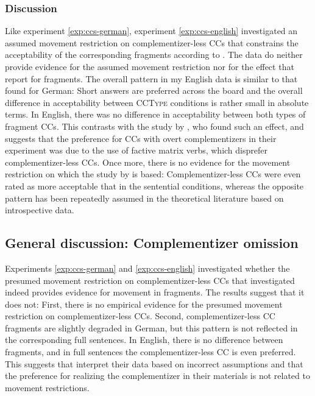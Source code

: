 \newpage
\subsubsection{Discussion}
Like experiment \ref{exp:ccs-german}, experiment \ref{exp:ccs-english} investigated an assumed movement restriction on complementizer-less CCs that constrains the acceptability of the corresponding fragments according to \citet{merchant.etal2013}. The data do neither provide evidence for the assumed movement restriction nor for the effect that \citet{merchant.etal2013} report for fragments. The overall pattern in my English data is similar to that found for German: Short answers are preferred across the board and the overall difference in acceptability between \textsc{CCType} conditions is rather small in absolute terms. In English, there was no difference in acceptability between both types of fragment CCs. This contrasts with the study by \citet{merchant.etal2013}, who found such an effect, and suggests that the preference for CCs with overt complementizers in their experiment was due to the use of factive matrix verbs, which disprefer complementizer-less CCs. Once more, there is no evidence for the movement restriction on which the study by \citet{merchant.etal2013} is based: Complementizer-less CCs were even rated as more acceptable that in the sentential conditions, whereas the opposite pattern has been repeatedly assumed in the theoretical literature based on introspective data.

\subsection{General discussion: Complementizer omission}
Experiments \ref{exp:ccs-german} and \ref{exp:ccs-english} investigated whether the presumed movement restriction on comple\-men\-tizer-less CCs that \citet{merchant.etal2013} investigated indeed provides evidence for movement in fragments. The results suggest that it does not: First, there is no empirical evidence for the presumed movement restriction on complementizer-less CCs. Second, complementizer-less CC fragments are slightly degraded in German, but this pattern is not reflected in the corresponding full sentences. In English, there is no difference between fragments, and in full sentences the complementizer-less CC is even preferred. This suggests that \citet{merchant.etal2013} interpret their data based on incorrect assumptions and that the preference for realizing the complementizer in their materials is not related to movement restrictions.


